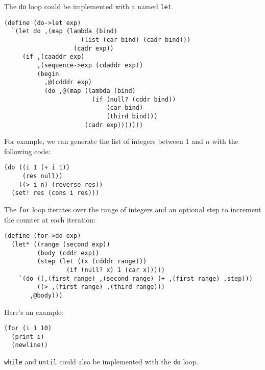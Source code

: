 \documentclass[a4paper,12pt]{article}
\begin{document}
The \lstinline!do! loop could be implemented with a named \lstinline!let!.
\begin{lstlisting}
(define (do->let exp)
  `(let do ,(map (lambda (bind)
                     (list (car bind) (cadr bind)))
                   (cadr exp))
     (if ,(caaddr exp)
         ,(sequence->exp (cdaddr exp))
         (begin
           ,@(cdddr exp)
           (do ,@(map (lambda (bind)
                        (if (null? (cddr bind))
                            (car bind)
                            (third bind)))
                      (cadr exp)))))))
\end{lstlisting}
For example, we can generate the list of integers between $1$ and $n$
with the following code:
\begin{lstlisting}
(do ((i 1 (+ i 1))
     (res null))
    ((> i n) (reverse res))
  (set! res (cons i res)))
\end{lstlisting}

The \lstinline!for! loop iterates over the range of integers and an
optional step to increment the counter at each iteration:

\begin{lstlisting}
(define (for->do exp)
  (let* ((range (second exp))
         (body (cddr exp))
         (step (let ((x (cdddr range)))
                 (if (null? x) 1 (car x)))))
    `(do ((,(first range) ,(second range) (+ ,(first range) ,step)))
         ((> ,(first range) ,(third range)))
       ,@body)))
\end{lstlisting}

Here's an example:

\begin{lstlisting}
(for (i 1 10)
  (print i)
  (newline))
\end{lstlisting}

\lstinline!while! and \lstinline!until! could also be implemented with the
\lstinline!do! loop.
\end{document}
